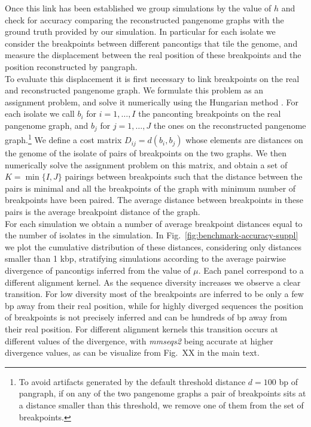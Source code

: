 \documentclass[aps,rmp,reprint,superscriptaddress,notitlepage,10pt,onecolumn]{revtex4-1}
\begin{document}
Once this link has been established we group simulations by the value of $h$ and check for accuracy comparing the reconstructed pangenome graphs with the ground truth provided by our simulation. In particular for each isolate we consider the breakpoints between different pancontigs that tile the genome, and measure the displacement between the real position of these breakpoints and the position reconstructed by pangraph.\\
To evaluate this displacement it is first necessary to link breakpoints on the real and reconstructed pangenome graph. We formulate this problem as an assignment problem, and solve it numerically using the Hungarian method \cite{kuhn1955hungarian}. For each isolate we call $b_i$ for $i=1,\ldots,I$ the panconting breakpoints on the real pangenome graph, and $b_j$ for $j=1,\ldots,J$ the ones on the reconstructed pangenome graph.\footnote{To avoid artifacts generated by the default threshold distance $d=100$ bp of pangraph, if on any of the two pangenome graphs a pair of breakpoints sits at a distance smaller than this threshold, we remove one of them from the set of breakpoints.} We define a cost matrix $D_{ij} = d(b_i,b_j)$ whose elements are distances on the genome of the isolate of pairs of breakpoints on the two graphs. We then numerically solve the assignment problem on this matrix, and obtain a set of $K = \min\{ I,J \}$ pairings between breakpoints such that the distance between the pairs is minimal and all the breakpoints of the graph with minimum number of breakpoints have been paired. The average distance between breakpoints in these pairs is the average breakpoint distance of the graph.\\
For each simulation we obtain a number of average breakpoint distances equal to the number of isolates in the simulation. In Fig.~\ref{fig:benchmark-accuracy-suppl} we plot the cumulative distribution of these distances, considering only distances smaller than 1 kbp, stratifying simulations according to the average pairwise divergence of pancontigs inferred from the value of $\mu$. Each panel correspond to a different alignment kernel. As the sequence diversity increases we observe a clear transition. For low diversity most of the breakpoints are inferred to be only a few bp away from their real position, while for highly diverged sequences the position of breakpoints is not precisely inferred and can be hundreds of bp away from their real position. For different alignment kernels this transition occurs at different values of the divergence, with \textit{mmseqs2} being accurate at higher divergence values, as can be visualize from Fig.~XX in the main text.
\end{document}
